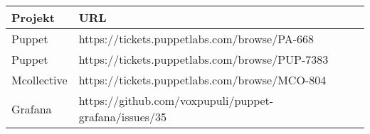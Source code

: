 \begin{center}
  \begin{tabularx}{\textwidth}{p{2.5cm} lX}
  \toprule
    Projekt     & URL                                                   \\
  \midrule
    Puppet      & https://tickets.puppetlabs.com/browse/PA-668          \\
    Puppet      & https://tickets.puppetlabs.com/browse/PUP-7383        \\
    Mcollective & https://tickets.puppetlabs.com/browse/MCO-804         \\
    Grafana     & https://github.com/voxpupuli/puppet-grafana/issues/35 \\
  \bottomrule
\end{tabularx}
\label{tbl:fossissues}
\end{center}
